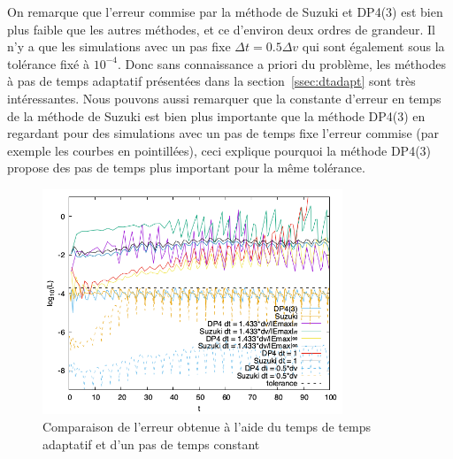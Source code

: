 On remarque que l'erreur commise par la méthode de Suzuki et DP4(3) est bien plus faible que les autres méthodes, et ce d'environ deux ordres de grandeur. Il n'y a que les simulations avec un pas fixe $\Delta t = 0.5\Delta v$ qui sont également sous la tolérance  fixé \`a 
$10^{-4}$. Donc sans connaissance a priori du problème, les méthodes à pas de temps adaptatif présentées dans la section~\ref{ssec:dtadapt} sont très intéressantes. Nous pouvons aussi remarquer que la constante d'erreur en temps de la méthode de Suzuki est bien plus importante que la méthode DP4(3) en regardant pour des simulations avec un pas de temps fixe l'erreur commise (par exemple les courbes en pointillées), ceci explique pourquoi la méthode DP4(3) propose des pas de temps plus important pour la même tolérance.

\begin{figure}[h]
  \centering
  \includegraphics[width=0.8\textwidth]{img/compare_error_dtc.png}
  \caption{Comparaison de l'erreur obtenue à l'aide du temps de temps adaptatif et d'un pas de temps constant}
  \label{fig:compare:error:dtc}
\end{figure}




